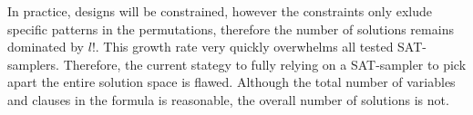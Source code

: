 In practice, designs will be constrained, however the constraints only exlude specific patterns in the permutations, therefore the number of solutions remains dominated by $l!$. This growth rate very quickly overwhelms all tested SAT-samplers. Therefore, the current stategy to fully relying on a SAT-sampler to pick apart the entire solution space is flawed. Although the total number of variables and clauses in the formula is reasonable, the overall number of solutions is not.
